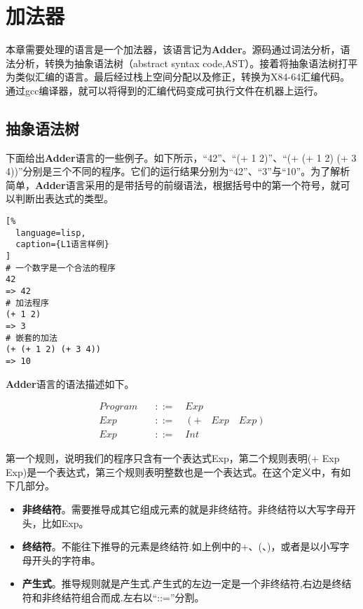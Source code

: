 \chapter{加法器}

本章需要处理的语言是一个加法器，该语言记为\textbf{Adder}。源码通过词法分析，语法分析，转换为抽象语法树（abstract syntax code,AST）。接着将抽象语法树打平为类似汇编的语言。最后经过栈上空间分配以及修正，转换为X84-64汇编代码。通过gcc编译器，就可以将得到的汇编代码变成可执行文件在机器上运行。

\section{抽象语法树}

下面给出\textbf{Adder}语言的一些例子。如下所示，“42”、“(+ 1 2)”、“(+ (+ 1 2) (+ 3 4))”分别是三个不同的程序。它们的运行结果分别为“42”、“3”与“10”。为了解析简单，\textbf{Adder}语言采用的是带括号的前缀语法，根据括号中的第一个符号，就可以判断出表达式的类型。

\begin{lstlisting}[%
  language=lisp,
  caption={L1语言样例}
]
# 一个数字是一个合法的程序
42
=> 42
# 加法程序
(+ 1 2)
=> 3
# 嵌套的加法
(+ (+ 1 2) (+ 3 4))
=> 10
\end{lstlisting}


\textbf{Adder}语言的语法描述如下。

\begin{equation}
\begin{aligned}
  \label{eq:1}
   Program \quad &::= \quad Exp \\
   Exp \quad &::= \quad (+ \quad Exp \quad Exp) \\
   Exp \quad &::=  \quad Int
\end{aligned}
\end{equation}

第一个规则，说明我们的程序只含有一个表达式Exp，第二个规则表明(+ Exp Exp)是一个表达式，第三个规则表明整数也是一个表达式。在这个定义中，有如下几部分。

\begin{itemize}
  \item \textbf{非终结符}。需要推导成其它组成元素的就是非终结符。非终结符以大写字母开头，比如Exp。
  \item \textbf{终结符}。不能往下推导的元素是终结符.如上例中的+、(、)，或者是以小写字母开头的字符串。
  \item \textbf{产生式}。推导规则就是产生式.产生式的左边一定是一个非终结符,右边是终结符和非终结符组合而成.左右以“::=”分割。
\end{itemize}

